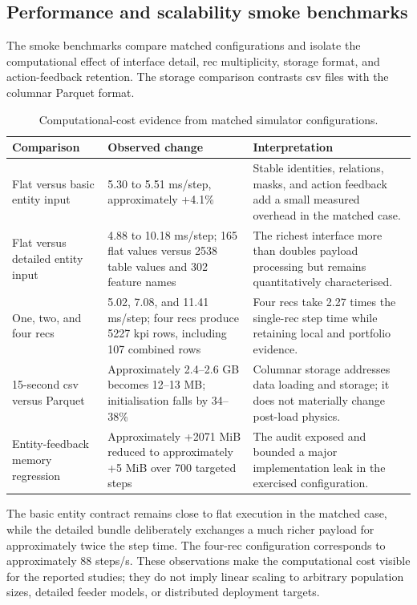 \subsection{Performance and scalability smoke benchmarks}

The smoke benchmarks compare matched configurations and isolate the computational effect of interface detail, \gls{rec} multiplicity, storage format, and action-feedback retention. The storage comparison contrasts \gls{csv} files with the columnar Parquet format.

\begin{table}[H]
\centering
\caption{Computational-cost evidence from matched simulator configurations.}
\label{tab:sim-performance-evidence}
\footnotesize
\begin{tabularx}{\textwidth}{@{}p{}p{}X@{}}
\toprule
\textbf{Comparison} & \textbf{Observed change} & \textbf{Interpretation} \\
\midrule
Flat versus basic entity input & 5.30 to 5.51 ms/step, approximately +4.1\% & Stable identities, relations, masks, and action feedback add a small measured overhead in the matched case. \\
Flat versus detailed entity input & 4.88 to 10.18 ms/step; 165 flat values versus 2538 table values and 302 feature names & The richest interface more than doubles payload processing but remains quantitatively characterised. \\
One, two, and four \glspl{rec} & 5.02, 7.08, and 11.41 ms/step; four \glspl{rec} produce 5227 \gls{kpi} rows, including 107 combined rows & Four \glspl{rec} take 2.27 times the single-\gls{rec} step time while retaining local and portfolio evidence. \\
15-second \gls{csv} versus Parquet & Approximately 2.4--2.6 GB becomes 12--13 MB; initialisation falls by 34--38\% & Columnar storage addresses data loading and storage; it does not materially change post-load physics. \\
Entity-feedback memory regression & Approximately +2071 MiB reduced to approximately +5 MiB over 700 targeted steps & The audit exposed and bounded a major implementation leak in the exercised configuration. \\
\bottomrule
\end{tabularx}
\end{table}

The basic entity contract remains close to flat execution in the matched case, while the detailed bundle deliberately exchanges a much richer payload for approximately twice the step time. The four-\gls{rec} configuration corresponds to approximately 88 steps/s. These observations make the computational cost visible for the reported studies; they do not imply linear scaling to arbitrary population sizes, detailed feeder models, or distributed deployment targets.

